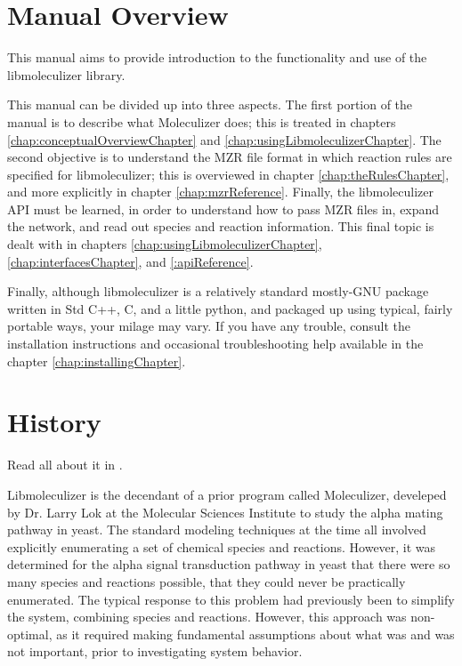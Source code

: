 \section{Manual Overview}
This manual aims to provide introduction to the functionality and use
of the libmoleculizer library.  

This manual can be divided up into three aspects.  The first portion
of the manual is to describe what Moleculizer does; this is treated in chapters
\ref{chap:conceptualOverviewChapter} and
\ref{chap:usingLibmoleculizerChapter}.  The second objective is to
understand the MZR file format in which reaction rules are specified
for libmoleculizer; this is overviewed in chapter \ref{chap:theRulesChapter},
and more explicitly in chapter \ref{chap:mzrReference}.  Finally,
the libmoleculizer API must be learned, in order to understand how to
pass MZR files in, expand the network, and read out species and
reaction information.  This final topic is dealt with in chapters
\ref{chap:usingLibmoleculizerChapter}, \ref{chap:interfacesChapter}, and
\ref{:apiReference}.

Finally, although libmoleculizer is a relatively standard mostly-GNU
package written in Std C++, C, and a little python, and packaged up
using typical, fairly portable ways, your milage may vary.  If you
have any trouble, consult the installation instructions and
occasional troubleshooting help available in the chapter
\ref{chap:installingChapter}.

\section{History}

Read all about it in \cite{lok05}.

Libmoleculizer is the decendant of a prior program called Moleculizer,
develeped by Dr. Larry Lok at the Molecular Sciences Institute to
study the alpha mating pathway in yeast. The standard modeling
techniques at the time all involved explicitly enumerating a set of
chemical species and reactions. However, it was determined for the
alpha signal transduction pathway in yeast that there were so many
species and reactions possible, that they could never be practically
enumerated. The typical response to this problem had previously been
to simplify the system, combining species and reactions. However,
this approach was non-optimal, as it required making fundamental
assumptions about what was and was not important, prior to
investigating system behavior. 

